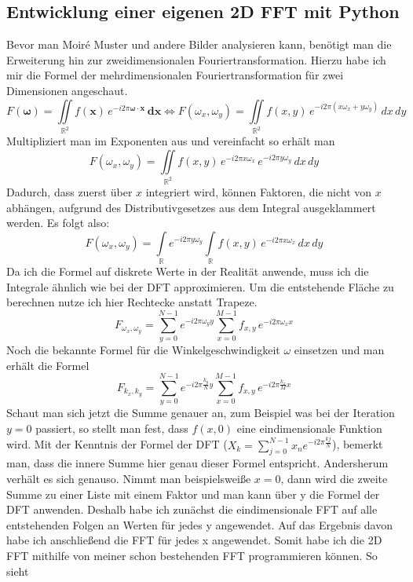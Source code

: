 \documentclass[a4paper,12pt]{article}
\theoremstyle{definition}
\theoremstyle{remark}
\begin{document}
\subsection{Entwicklung einer eigenen 2D FFT mit Python}
Bevor man Moiré Muster und andere Bilder analysieren kann, benötigt man die Erweiterung hin zur zweidimensionalen Fouriertransformation. Hierzu 
habe ich mir die Formel der mehrdimensionalen Fouriertransformation für zwei Dimensionen angeschaut. 
\[
F(\mathbf{\omega}) = \iint\limits_{\mathbb{R}^2} f(\mathbf{x}) \, e^{-i2\pi \mathbf{\omega} \cdot \mathbf{x}} \,\mathbf{dx}
\Leftrightarrow F(\omega_x, \omega_y) = \iint\limits_{\mathbb{R}^2} f(x, y) \, e^{-i2\pi (x \omega_x + y \omega_y)} \, dx \, dy
\]
Multipliziert man im Exponenten aus und vereinfacht so erhält man 
\[
F(\omega_x, \omega_y) = \iint\limits_{\mathbb{R}^2} f(x, y) \, e^{-i2\pi x \omega_x} \, e^{-i2\pi y \omega_y} \, dx \, dy
\]
Dadurch, dass zuerst über $x$ integriert wird, können Faktoren, die nicht von $x$ abhängen, aufgrund des Distributivgesetzes aus dem Integral ausgeklammert werden. Es folgt also:
\[
F(\omega_x, \omega_y) = \int\limits_{\mathbb{R}} e^{-i2\pi y \omega_y} \int\limits_{\mathbb{R}} f(x, y) \, e^{-i2\pi x \omega_x} \, dx \, dy
\]
Da ich die Formel auf diskrete Werte in der Realität anwende, muss ich die Integrale ähnlich wie bei der DFT approximieren. Um die entstehende Fläche zu 
berechnen nutze ich hier Rechtecke anstatt Trapeze.
\[
F_{\omega_x, \omega_y} = \sum_{y=0}^{N-1} {e^{-i2\pi \omega_y y} \sum_{x=0}^{M-1}{f_{x, y} \, e^{-i2\pi \omega_x x}}} 
\]
Noch die bekannte Formel für die Winkelgeschwindigkeit $\omega$ einsetzen und man erhält die Formel 
\[
F_{k_x, k_y} = \sum_{y=0}^{N-1} {e^{-i2\pi \frac{k_y}{N} y} \sum_{x=0}^{M-1}{f_{x, y} \, e^{-i2\pi \frac{k_x}{M} x}}}
\]
Schaut man sich jetzt die Summe genauer an, zum Beispiel was bei der Iteration $y=0$ passiert, so stellt man fest, dass $f(x,0)$ eine eindimensionale Funktion 
wird. Mit der Kenntnis der Formel der DFT ($X_k = \sum_{j = 0}^{N-1}{x_n e^{-i2\pi \frac{kj}{N}}}$), bemerkt man, dass die innere Summe hier genau dieser Formel 
entspricht. Andersherum verhält es sich genauso. Nimmt man beispielsweiße $x=0$, dann wird die zweite Summe zu einer Liste mit einem Faktor und man kann über y 
die Formel der DFT anwenden. Deshalb habe ich zunächst die eindimensionale FFT auf alle entstehenden Folgen an Werten für jedes y angewendet. Auf das Ergebnis 
davon habe ich anschließend die FFT für jedes x angewendet. Somit habe ich die 2D FFT mithilfe von meiner schon bestehenden FFT programmieren können. So sieht 
\end{document}
